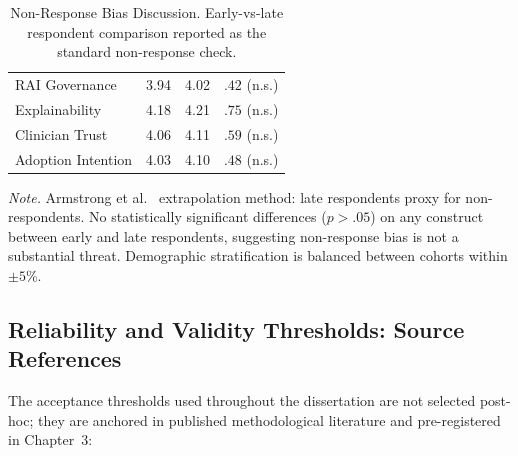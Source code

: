 {\tablestripes\tablefontsize
{}
\begin{xltabular}{\textwidth}{@{} >{\raggedright\arraybackslash}p{2.8cm} L L >{\centering\arraybackslash}p{2.0cm} @{}}
\caption[Non-Response Bias]{Non-Response Bias Discussion. Early-vs-late respondent comparison \cite{armstrong1977estimating} reported as the standard non-response check.}\label{tab:appd_nonresponse} \\
\toprule
{} &  &  &  \\
\midrule
\endfirsthead
\endhead
\bottomrule
\endlastfoot
RAI Governance       & 3.94 & 4.02 & $.42$ (n.s.) \\
Explainability       & 4.18 & 4.21 & $.75$ (n.s.) \\
Clinician Trust      & 4.06 & 4.11 & $.59$ (n.s.) \\
Adoption Intention   & 4.03 & 4.10 & $.48$ (n.s.) \\
\end{xltabular}}
\vspace{0.4em}
\noindent\textit{Note.} Armstrong et al.~\cite{armstrong1977estimating} extrapolation method: late respondents proxy for non-respondents. No statistically significant differences ($p > .05$) on any construct between early and late respondents, suggesting non-response bias is not a substantial threat. Demographic stratification is balanced between cohorts within $\pm 5$\%.

\subsection*{Reliability and Validity Thresholds: Source References}
\label{sec:appd_thresholds_refs}

\noindent The acceptance thresholds used throughout the dissertation are not selected post-hoc; they are anchored in published methodological literature and pre-registered in Chapter~3:

